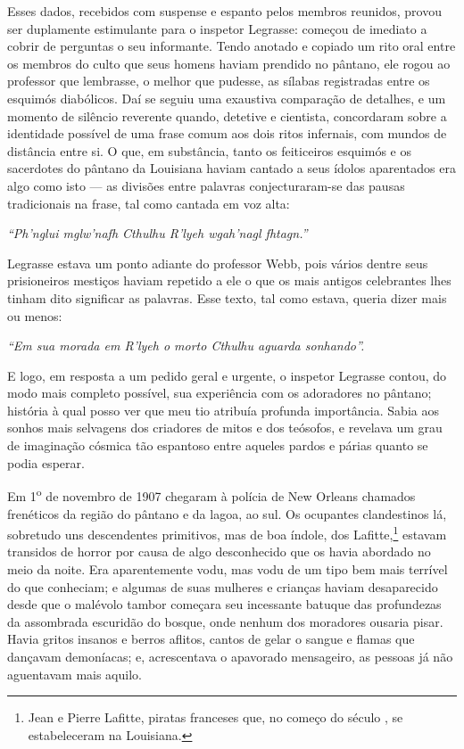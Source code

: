Esses dados, recebidos com suspense e espanto pelos membros reunidos,
provou ser duplamente estimulante para o inspetor Legrasse: começou de
imediato a cobrir de perguntas o seu informante. Tendo anotado e copiado
um rito oral entre os membros do culto que seus homens haviam prendido
no pântano, ele rogou ao professor que lembrasse, o melhor que pudesse,
as sílabas registradas entre os esquimós diabólicos. Daí se seguiu uma
exaustiva comparação de detalhes, e um momento de silêncio reverente
quando, detetive e cientista, concordaram sobre a identidade possível de
uma frase comum aos dois ritos infernais, com mundos de distância entre
si. O que, em substância, tanto os feiticeiros esquimós e os sacerdotes
do pântano da Louisiana haviam cantado a seus ídolos aparentados era
algo como isto --- as divisões entre palavras conjecturaram-se das
pausas tradicionais na frase, tal como cantada em voz alta:

\emph{``Ph'nglui mglw'nafh Cthulhu R'lyeh wgah'nagl fhtagn.''}

Legrasse estava um ponto adiante do professor Webb, pois vários dentre
seus prisioneiros mestiços haviam repetido a ele o que os mais antigos
celebrantes lhes tinham dito significar as palavras. Esse texto, tal
como estava, queria dizer mais ou menos:

\emph{``Em sua morada em R'lyeh o morto Cthulhu aguarda sonhando''.}

E logo, em resposta a um pedido geral e urgente, o inspetor Legrasse
contou, do modo mais completo possível, sua experiência com os
adoradores no pântano; história à qual posso ver que meu tio atribuía
profunda importância. Sabia aos sonhos mais selvagens dos criadores de
mitos e dos teósofos, e revelava um grau de imaginação cósmica tão
espantoso entre aqueles pardos e párias quanto se podia esperar.

Em 1\textsuperscript{o} de novembro de 1907 chegaram à polícia de
New Orleans chamados frenéticos da região do pântano e da lagoa, ao sul.
Os ocupantes clandestinos lá, sobretudo uns descendentes primitivos, mas
de boa índole, dos Lafitte,\footnote{Jean e Pierre Lafitte, piratas
  franceses que, no começo do século , se estabeleceram na Louisiana.}
estavam transidos de horror por causa de algo desconhecido que os havia
abordado no meio da noite. Era aparentemente vodu, mas vodu de um tipo
bem mais terrível do que conheciam; e algumas de suas mulheres e
crianças haviam desaparecido desde que o malévolo tambor começara seu
incessante batuque das profundezas da assombrada escuridão do bosque,
onde nenhum dos moradores ousaria pisar. Havia gritos insanos e berros
aflitos, cantos de gelar o sangue e flamas que dançavam demoníacas; e,
acrescentava o apavorado mensageiro, as pessoas já não aguentavam mais
aquilo.

